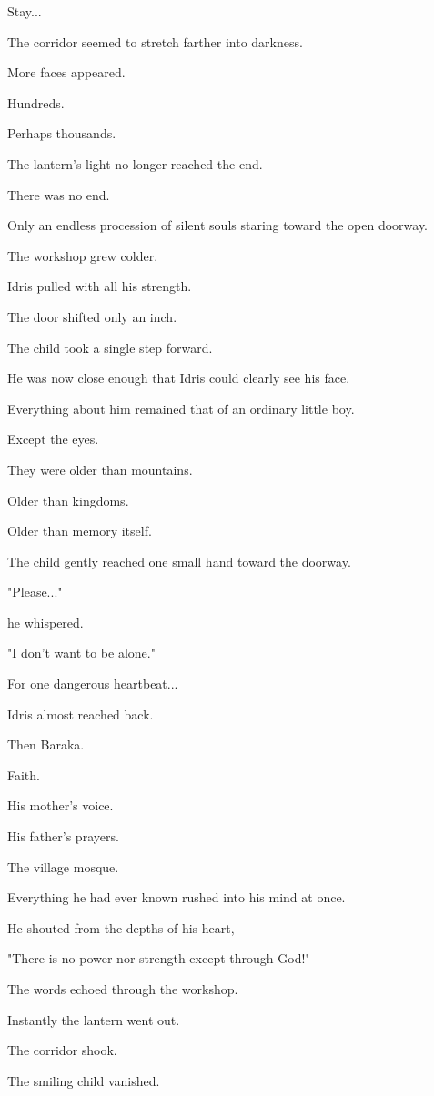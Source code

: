 \documentclass[12pt,openany]{book}
\begin{document}
Stay...

The corridor seemed to stretch farther into darkness.

More faces appeared.

Hundreds.

Perhaps thousands.

The lantern's light no longer reached the end.

There was no end.

Only an endless procession of silent souls staring toward the open doorway.

The workshop grew colder.

Idris pulled with all his strength.

The door shifted only an inch.

The child took a single step forward.

He was now close enough that Idris could clearly see his face.

Everything about him remained that of an ordinary little boy.

Except the eyes.

They were older than mountains.

Older than kingdoms.

Older than memory itself.

The child gently reached one small hand toward the doorway.

"Please..."

he whispered.

"I don't want to be alone."

For one dangerous heartbeat...

Idris almost reached back.

Then Baraka.

Faith.

His mother's voice.

His father's prayers.

The village mosque.

Everything he had ever known rushed into his mind at once.

He shouted from the depths of his heart,

"There is no power nor strength except through God!"

The words echoed through the workshop.

Instantly the lantern went out.

The corridor shook.

The smiling child vanished.
\end{document}
